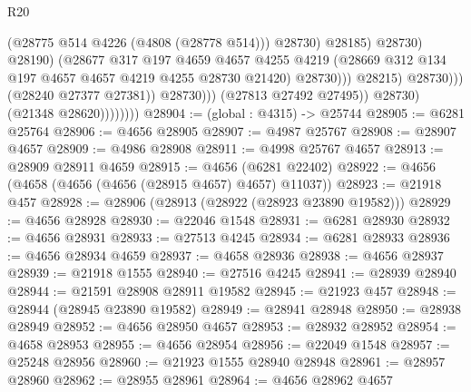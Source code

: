 \begin{lexlean}{R20}
\begin{coremodule}
                                                  (@28775 @514 @4226 (@4808 (@28778 @514)))
                                                  @28730)
                                                @28185)
                                              @28730)
                                            @28190)
                                          (@28677
                                            @317
                                            @197
                                            @4659
                                            @4657
                                            @4255
                                            @4219
                                            (@28669
                                              @312
                                              @134
                                              @197
                                              @4657
                                              @4657
                                              @4219
                                              @4255
                                              @28730
                                              @21420)
                                            @28730)))
                                      @28215)
                                    @28730)))
                              (@28240 @27377 @27381))
                            @28730)))
                      (@27813 @27492 @27495))
                    @28730)
                  (@21348 @28620))))))))
@28904 := (global : @4315) -> @25744
@28905 := @6281 @25764
@28906 := @4656 @28905
@28907 := @4987 @25767
@28908 := @28907 @4657
@28909 := @4986 @28908
@28911 := @4998 @25767 @4657
@28913 := @28909 @28911 @4659
@28915 := @4656 (@6281 @22402)
@28922 := @4656 (@4658 (@4656 (@4656 (@28915 @4657) @4657) @11037))
@28923 := @21918 @457
@28928 := @28906 (@28913 (@28922 (@28923 @23890 @19582)))
@28929 := @4656 @28928
@28930 := @22046 @1548
@28931 := @6281 @28930
@28932 := @4656 @28931
@28933 := @27513 @4245
@28934 := @6281 @28933
@28936 := @4656 @28934 @4659
@28937 := @4658 @28936
@28938 := @4656 @28937
@28939 := @21918 @1555
@28940 := @27516 @4245
@28941 := @28939 @28940
@28944 := @21591 @28908 @28911 @19582
@28945 := @21923 @457
@28948 := @28944 (@28945 @23890 @19582)
@28949 := @28941 @28948
@28950 := @28938 @28949
@28952 := @4656 @28950 @4657
@28953 := @28932 @28952
@28954 := @4658 @28953
@28955 := @4656 @28954
@28956 := @22049 @1548
@28957 := @25248 @28956
@28960 := @21923 @1555 @28940 @28948
@28961 := @28957 @28960
@28962 := @28955 @28961
@28964 := @4656 @28962 @4657

\end{coremodule}
\end{lexlean}
